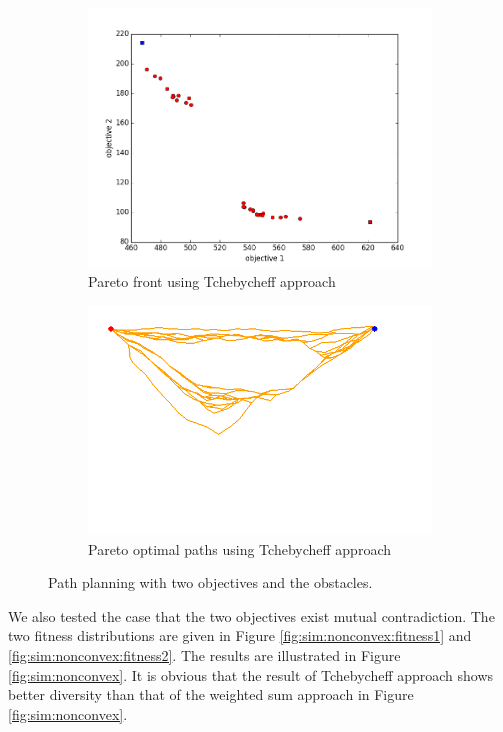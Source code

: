 \documentclass[conference]{IEEEtran}
\begin{document}
\begin{figure}
\begin{subfigure}[b]{0.45\linewidth}
		\includegraphics[width=\textwidth]{fig/sim5-obstacle/PF05-MORRT2.png}
		\caption{Pareto front using Tchebycheff approach}
		\label{fig:sim:obs:pf:b}
	\end{subfigure} 
	\begin{subfigure}[b]{0.45\linewidth}
		\centering
		\includegraphics[width=\textwidth]{fig/sim5-obstacle/MORRTstar01-1-ALL.png}
		\caption{Pareto optimal paths using Tchebycheff approach}
		\label{fig:sim:obs:sols:b}
	\end{subfigure}
	\caption{Path planning with two objectives and the obstacles.}
	\label{fig:sim:obs}
\end{figure}

We also tested the case that the two objectives exist mutual contradiction.
The two fitness distributions are given in Figure \ref{fig:sim:nonconvex:fitness1} and \ref{fig:sim:nonconvex:fitness2}.
The results are illustrated in Figure \ref{fig:sim:nonconvex}.
It is obvious that the result of Tchebycheff approach shows better diversity than that of the weighted sum approach in Figure \ref{fig:sim:nonconvex}.
\end{document}
